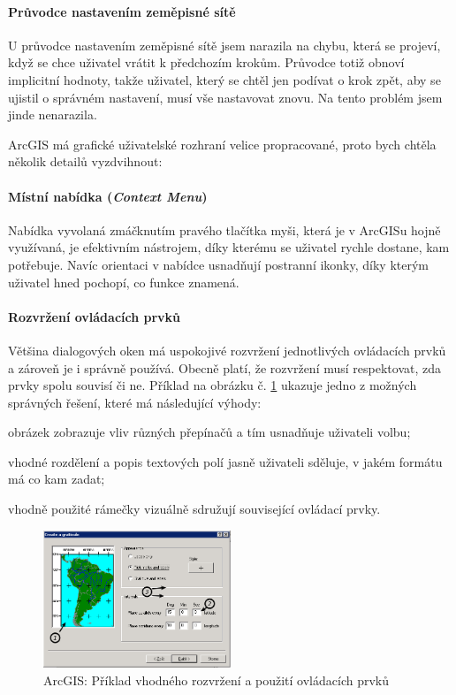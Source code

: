 \documentclass[a4paper,12pt,draft]{article}
\begin{document}
\paragraph*{Průvodce nastavením zeměpisné sítě}
U průvodce nastavením zeměpisné sítě jsem narazila na chybu, která se
projeví, když se chce uživatel vrátit k předchozím krokům. Průvodce
totiž obnoví implicitní hodnoty, takže uživatel, který se chtěl jen
podívat o krok zpět, aby se ujistil o správném nastavení, musí vše
nastavovat znovu. Na tento problém jsem jinde nenarazila.

ArcGIS má grafické uživatelské rozhraní velice propracované, proto
bych chtěla několik detailů vyzdvihnout:
\paragraph*{Místní nabídka (\emph{Context Menu})}
Nabídka vyvolaná zmáčknutím pravého tlačítka myši, která je v ArcGISu
hojně využívaná, je efektivním nástrojem, díky kterému se uživatel
rychle dostane, kam potřebuje. Navíc orientaci v nabídce usnadňují
postranní ikonky, díky kterým uživatel hned pochopí, co funkce znamená.
\paragraph*{Rozvržení ovládacích prvků}
Většina dialogových oken má uspokojivé rozvržení jednotlivých
ovládacích prvků a zároveň je i správně používá. Obecně platí,
že rozvržení musí respektovat, zda prvky spolu souvisí či ne. Příklad
na obrázku č. \ref{fig:ArcGIS_graticule_wizard} ukazuje jedno z možných
správných řešení, které má následující výhody:
\begin{inparaenum}[\itshape 1\upshape)]
\item obrázek zobrazuje vliv různých přepínačů a tím usnadňuje
uživateli volbu;
\item vhodné rozdělení a popis textových polí jasně uživateli sděluje,
v jakém formátu má co kam zadat;
\item vhodně použité rámečky vizuálně sdružují související
ovládací prvky.
\end{inparaenum}


\begin{figure}[h!]
\centering
\includegraphics[width=0.5\textwidth]{./GUI_screenshots/ArcGIS_graticule_wizard.png}
\caption{ArcGIS: Příklad vhodného rozvržení a použití ovládacích
prvků}
\label{fig:ArcGIS_graticule_wizard}
\end{figure}
\end{document}
